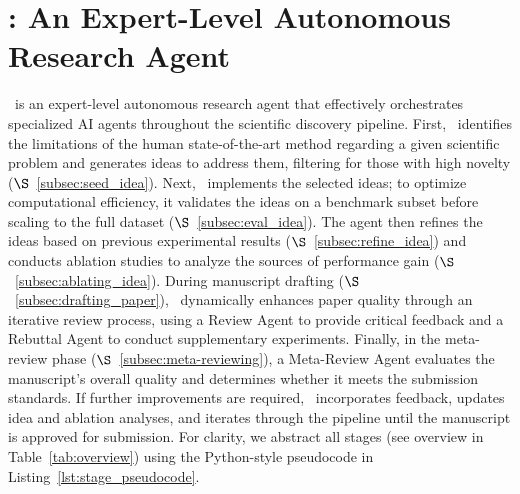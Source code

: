 

\section{\sname: An Expert-Level Autonomous Research Agent}\label{sec:method}

\sname~is an expert-level autonomous research agent that effectively orchestrates specialized AI agents throughout the scientific discovery pipeline. First, \sname~identifies the limitations of the human state-of-the-art method regarding a given scientific problem and generates ideas to address them, filtering for those with high novelty ($\S$~\ref{subsec:seed_idea}). Next, \sname~implements the selected ideas; to optimize computational efficiency, it validates the ideas on a benchmark subset before scaling to the full dataset ($\S$~\ref{subsec:eval_idea}). The agent then refines the ideas based on previous experimental results ($\S$~\ref{subsec:refine_idea}) and conducts ablation studies to analyze the sources of performance gain ($\S$~\ref{subsec:ablating_idea}). During manuscript drafting ($\S$~\ref{subsec:drafting_paper}), \sname~dynamically enhances paper quality through an iterative review process, using a Review Agent to provide critical feedback and a Rebuttal Agent to conduct supplementary experiments. Finally, in the meta-review phase ($\S$~\ref{subsec:meta-reviewing}), a Meta-Review Agent evaluates the manuscript's overall quality and determines whether it meets the submission standards. If further improvements are required, \sname~incorporates feedback, updates idea and ablation analyses, and iterates through the pipeline until the manuscript is approved for submission. For clarity, we abstract all stages (see overview in Table~\ref{tab:overview}) using the Python-style pseudocode in Listing~\ref{lst:stage_pseudocode}.

